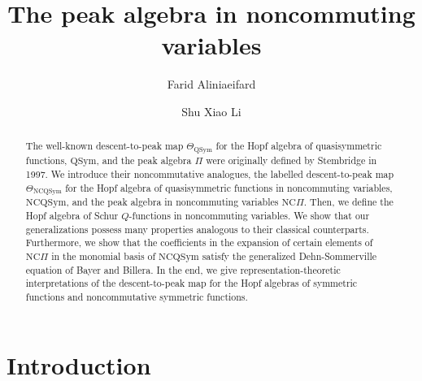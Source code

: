 \documentclass[11pt]{amsart}
\title{The peak algebra in noncommuting variables}
\author{Farid Aliniaeifard}
\author{Shu Xiao Li}
\date{}
\numberwithin{equation}{section}
\newcommand{\NCQSym}{\mathrm{NCQSym}}
\newcommand{\QSym}{\mathrm{QSym}}
\newcommand{\NCPeak}{\mathrm{NC}\Pi}
\begin{document}
\maketitle



\begin{abstract}
The well-known descent-to-peak map $\Theta_{\QSym}$ for the Hopf algebra of quasisymmetric functions, $\QSym$, and the peak algebra $\Pi$ were originally defined by Stembridge in 1997. We introduce their noncommutative analogues,  the labelled descent-to-peak map $\Theta_{{\NCQSym}}$ for the Hopf algebra of quasisymmetric functions in noncommuting variables, $\NCQSym$, and the peak algebra in noncommuting variables $\NCPeak$. Then, we define the Hopf algebra of  Schur $Q$-functions in noncommuting variables. We show that our generalizations possess many properties analogous to their classical counterparts. Furthermore, we show that the coefficients in the expansion of certain elements of $\NCPeak$ in the monomial basis of $\NCQSym$ satisfy the generalized Dehn-Sommerville equation of Bayer and Billera. In the end, we give representation-theoretic interpretations of the descent-to-peak map for the Hopf algebras of symmetric functions and noncommutative symmetric functions. 
\end{abstract}


\tableofcontents 




\section{Introduction}
\end{document}

